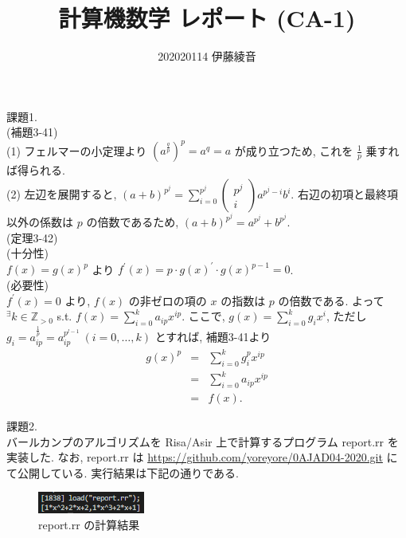 \documentclass[dvipdfmx]{jsarticle}
\title{計算機数学 レポート (CA-1)}
\author{202020114 伊藤綾音}
\begin{document}
\maketitle

\noindent
課題1.\\
(補題3-41)\\
(1) フェルマーの小定理より $(a^{\frac{q}{p}})^{p} = a^{q} = a$ が成り立つため, これを $\frac{1}{p}$ 乗すれば得られる. \\
(2) 左辺を展開すると, $\displaystyle (a+b)^{p^{j}} = \sum_{i=0}^{p^{j}} \begin{pmatrix} p^{j} \\ i \end{pmatrix} a^{p^{j}-i}b^{i}$. 
右辺の初項と最終項以外の係数は $p$ の倍数であるため, $(a+b)^{p^{j}} = a^{p^{j}} + b^{p^{j}}$. \\
(定理3-42)\\
(十分性)\\
$f(x) = g(x)^{p}$ より $f^{\prime}(x) = p \cdot g(x)^{\prime} \cdot g(x)^{p-1} = 0$. \\
(必要性)\\
$f^{\prime}(x) = 0$ より, $f(x)$ の非ゼロの項の $x$ の指数は $p$ の倍数である. よって $^{\exists}k \in \mathbb{Z}_{>0}$ s.t. $\displaystyle f(x) = \sum_{i=0}^{k} a_{ip}x^{ip}$. 
ここで, $\displaystyle g(x) = \sum_{i=0}^{k} g_{i}x^{i}$, ただし $g_{i} = a_{ip}^{\frac{1}{p}} = a_{ip}^{p^{l-1}} \ (i = 0, \ldots, k)$ とすれば, 補題3-41より
\begin{eqnarray}
g(x)^{p} & = & \sum_{i=0}^{k} g_{i}^{p}x^{ip} \nonumber \\
         & = & \sum_{i=0}^{k} a_{ip}x^{ip} \nonumber \\
         & = & f(x). \nonumber
\end{eqnarray}

\noindent
課題2.\\ 
バールカンプのアルゴリズムを Risa/Asir \cite{asir}上で計算するプログラム report.rr を実装した. 
なお, report.rr は \url{https://github.com/yoreyore/0AJAD04-2020.git} にて公開している.
実行結果は下記の通りである. 

\begin{figure}[h]
\begin{center}
\includegraphics[scale=1]{./report.png}
\caption{report.rr の計算結果}
\end{center}
\end{figure}
\end{document}
